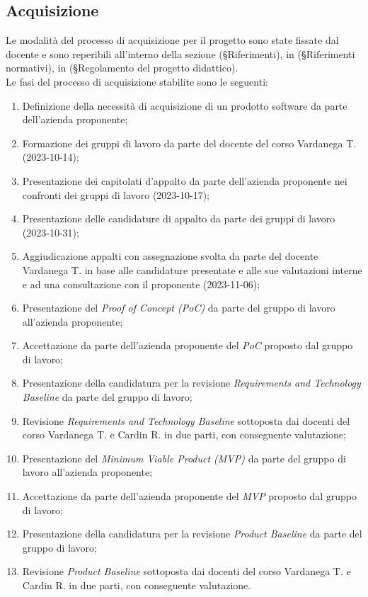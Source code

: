 \documentclass[10pt, a4paper]{article}
\begin{document}
\subsection{Acquisizione}
Le modalità del processo di acquisizione per il progetto sono state fissate dal docente e sono reperibili all'interno della sezione 
(\S Riferimenti), in (\S Riferimenti normativi), in (\S Regolamento del progetto didattico).\\
Le fasi del processo di acquisizione stabilite sono le seguenti:
\begin{enumerate}
    \item Definizione della necessità di acquisizione di un prodotto software da parte dell'azienda proponente;
    \item Formazione dei gruppi di lavoro da parte del docente del corso Vardanega T.(2023-10-14);
    \item Presentazione dei capitolati d'appalto da parte dell'azienda proponente nei confronti dei gruppi di lavoro (2023-10-17);
    \item Presentazione delle candidature di appalto da parte dei gruppi di lavoro (2023-10-31);
    \item Aggiudicazione appalti con assegnazione svolta da parte del docente Vardanega T. in base alle candidature presentate e alle sue 
    valutazioni interne e ad una consultazione con il proponente (2023-11-06);
    \item Presentazione del \textit{Proof of Concept (PoC)} da parte del gruppo di lavoro all'azienda proponente;
    \item Accettazione da parte dell'azienda proponente del \textit{PoC} proposto dal gruppo di lavoro;
    \item Presentazione della candidatura per la revisione \textit{Requirements and Technology Baseline} da parte del gruppo di lavoro;
    \item Revisione \textit{Requirements and Technology Baseline} sottoposta dai docenti del corso Vardanega T. e Cardin R. in due parti, con 
    conseguente valutazione;
    \item Presentazione del \textit{Minimum Viable Product (MVP)} da parte del gruppo di lavoro all'azienda proponente;
    \item Accettazione da parte dell'azienda proponente del \textit{MVP} proposto dal gruppo di lavoro;
    \item Presentazione della candidatura per la revisione \textit{Product Baseline} da parte del gruppo di lavoro;
    \item Revisione \textit{Product Baseline} sottoposta dai docenti del corso Vardanega T. e Cardin R. in due parti, con 
    conseguente valutazione.
\end{enumerate}
\end{document}
